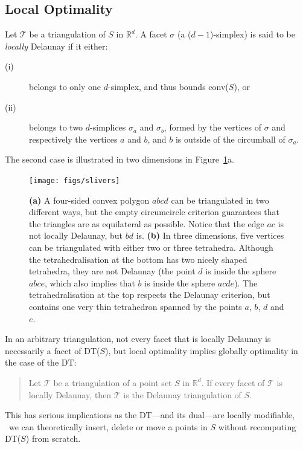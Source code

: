 \subsection{Local Optimality}
Let $\mathcal{T}$ be a triangulation of $S$ in $\mathbb{R}^d$. 
A facet $\sigma$ 
(a ($d-1$)-simplex) is said to be \emph{locally} Delaunay if it either:
\begin{description}
  \item[(i)] belongs to only one $d$-simplex, and thus bounds conv($S$), or
  \item[(ii)] belongs to two $d$-simplices $\sigma_a$ and $\sigma_b$, formed by the vertices of $\sigma$ and respectively the vertices $a$ and $b$, and $b$ is outside of the circumball of $\sigma_a$.
\end{description}
The second case is illustrated in two dimensions in Figure~\ref{fig:slivers}a. 
\begin{figure}
  \centering
  \texttt{[image: figs/slivers]}
  \caption[A four-sided convex polygon can be triangulated in two different ways]{\textbf{(a)} A four-sided convex polygon $abcd$ can be triangulated in two different ways, but the empty circumcircle criterion guarantees that the triangles are as equilateral as possible. Notice that the edge $ac$ is not locally Delaunay, but $bd$ is. \textbf{(b)} In three dimensions, five vertices can be triangulated with either two or three tetrahedra. Although the tetrahedralisation at the bottom has two nicely shaped tetrahedra, they are not Delaunay (the point $d$ is inside the sphere $abce$, which also implies that $b$ is inside the sphere $acde$). The tetrahedralisation at the top respects the Delaunay criterion, but contains one very thin tetrahedron spanned by the points $a$, $b$, $d$ and $e$.}%
\label{fig:slivers}
\end{figure}
In an arbitrary triangulation, not every facet that is locally Delaunay is necessarily a facet of DT($S$), but local optimality implies globally optimality in the case of the DT:
\begin{quote}
  Let $\mathcal{T}$ be a triangulation of a point set $S$ in $\mathbb{R}^d$. If every facet of $\mathcal{T}$ is locally Delaunay, then $\mathcal{T}$ is the Delaunay triangulation of $S$.
\end{quote}
This has serious implications as the DT---and its dual---are locally modifiable, \ie\ we can theoretically insert, delete or move a points in $S$ without recomputing DT($S$) from scratch.


